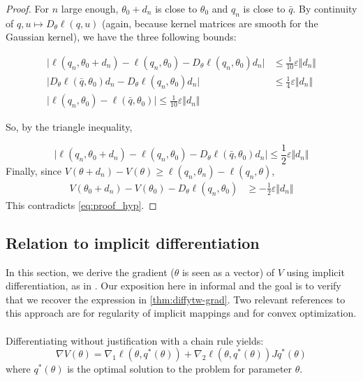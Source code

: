 \begin{proof}
   For $n$ large enough, $\theta_0 + d_n$ is close to $\theta_0$ and $q_n$ is close to $\bar q$. By continuity of $q, u \mapsto D_\theta\ell(q, u)$ (again, because kernel matrices are smooth for the Gaussian kernel), we have the three following bounds:

   \begin{align}
       \vert \ell(q_n, \theta_0 + d_n) - \ell(q_n, \theta_0) - D_\theta \ell(q_n, \theta_0)d_n\vert &\leq \frac{1}{10} \varepsilon \Vert d_n \Vert\\
        \vert D_\theta \ell(\bar q, \theta_0)d_n - D_\theta \ell(q_n, \theta_0)d_n\vert &\leq \frac{1}{4}\varepsilon \Vert d_n \Vert\\
        \vert \ell(q_n, \theta_0) - \ell(\bar q, \theta_0) \vert \leq \frac{1}{10}\varepsilon \Vert d_n \Vert
    \end{align}

    So, by the triangle inequality,

    \begin{equation}
       \vert \ell(q_n, \theta_0 + d_n) - \ell(q_n, \theta_0) - D_\theta \ell(\bar q, \theta_0)d_n\vert \leq \frac{1}{2} \varepsilon \Vert d_n \Vert
    \end{equation}
    Finally, since $V(\theta + d_n) - V(\theta) \geq \ell(q_n, \theta_n) - \ell(q_n, \theta)$,
    \begin{align}
        V(\theta_0 + d_n) - V(\theta_0) - D_\theta \ell(q_n, \theta_0)&\geq-\frac{1}{2}\varepsilon\Vert d_n\Vert
    \end{align}
    This contradicts \cref{eq:proof_hyp}.
\end{proof}






\subsection{Relation to implicit differentiation}\label{sec:lagrangian}
In this section, we derive the gradient ($\theta$ is seen as a vector) of $V$ using implicit differentiation, as in \citet{optnet}. Our exposition here in informal and the goal is to verify that we recover the expression in \cref{thm:diffytw-grad}.
Two relevant references to this approach are \cite{rockafellar} for regularity of implicit mappings and \cite{convex-optimization} for convex optimization.

\paragraph{}
Differentiating without justification with a chain rule yields:
\begin{equation}\label{eq:lagrangian-first}
    \nabla V(\theta) = \nabla_1 \ell(\theta, q^*(\theta)) + \nabla_2 \ell(\theta, q^*(\theta))J q^*(\theta)
\end{equation}
where $q^*(\theta)$ is the optimal solution to the problem for parameter $\theta$.

